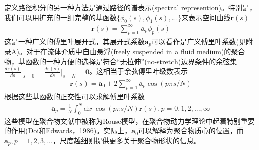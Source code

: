 定义路径积分的另一种方法是通过路径的谱表示(spectral represention)。特别是，我们可以用扩充的一组完整的基函数$\lbrace \phi _0(s),\phi _1(s),... \rbrace$来表示空间曲线$\mathbf{r}(s)$
\begin{gather}
\mathbf{r}(s)=\sum_{p=0}^{\infty} \mathbf{a}_p \phi _p(s)
\end{gather}
这是一种广义的傅里叶展开式，其展开式系数$\mathbf{a}_p$可以看作是广义傅里叶系数(见附录A)。对于在流体介质中自由悬浮(freely suspended in a fluid medium)的聚合物，基函数的一种方便的选择是符合“无拉伸”(no-stretch)边界条件的余弦集$\frac{d\mathbf{r}(s)}{ds}\vert _{s=0}=\frac{d\mathbf{r}(s)}{ds}\vert _{s=N}=0$。这相当于余弦傅里叶级数表示
\begin{gather}
\mathbf{r}(s)=\mathbf{a}_0+2\sum_{p=1}^{\infty} \mathbf{a}_p \cos(p\pi s/N)
\end{gather}
根据这些基函数的正交性可以求解傅里叶系数
\begin{gather}
\mathbf{a}_p=\frac{1}{N}\int_{0}^{N}  \mathrm{d}x~\cos(p\pi s/N)\mathbf{r}(s),p=0,1,2,...,\infty
\end{gather}
这些模型在聚合物文献中被称为Rouse模型，在聚合物动力学理论中起着特别重要的作用(Doi和Edwards，1986)。实际上，$\mathbf{a}_0$可以解释为聚合物质心的位置，而$\mathbf{a}_p,p=1,2,3,...$，尺度越细则提供更多关于聚合物形状的信息。

